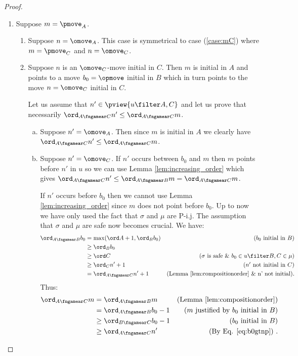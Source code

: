 \begin{proof}
\begin{enumerate}[(1)]
\item \label{case:mA} Suppose $m = \pmove_A$.
\begin{enumerate}

\item Suppose $n=\omove_A$.
This case is symmetrical to case
(\ref{case:mC}) where $m=\pmove_C$ and $n=\omove_C$.

\item Suppose  $n$ is an $\omove_C$-move initial in $C$.
Then $m$ is initial in $A$ and points to a move
$b_0 = \opmove$ initial in $B$ which in turn points to the
move $n =\omove_C$ initial in $C$.

Let us assume that $n'\in \pview{u\filter A,C}$ and let us prove that necessarily $\ord_{A\fngamear C} n' \leq \ord_{A\fngamear C} m$.

	\begin{enumerate}[(a)]
	\item Suppose $n'=\omove_A$. Then
since $m$ is initial in $A$ we clearly have 
$\ord_{A\fngamear C} n' \leq \ord_{A\fngamear C} m$.

	\item Suppose $n'=\omove_C$.
	If $n'$ occurs between $b_0$ and $m$ then $m$ points before $n'$ in 		$u$ so we can use Lemma \ref{lem:increasing_order} which gives $\ord_{A\fngamear C} n' \leq \ord_{A\fngamear B} m
		= \ord_{A\fngamear C} m$.
		\smallskip
		
		
		If $n'$ occurs before $b_0$ then 
		we cannot use Lemma \ref{lem:increasing_order}
		since $m$ does not point before $b_0$.
Up to now we have only used the fact that $\sigma$ and $\mu$ are P-i.j. The assumption that $\sigma$ and $\mu$ are safe now becomes crucial. We have:
		\begin{align}
		\ord_{A\fngamear B} b_0 
		& = \max(\ord A +1, \ord_B b_0) & \mbox{($b_0$ initial in $B$)} \nonumber \\
		& \geq \ord_B b_0 \nonumber  \\
		& \geq \ord C & \mbox{($\sigma$ is safe \& $b_0 \in u \filter  B,C \in \mu$)} \nonumber  \\
		& \geq \ord_C n' +1 & \mbox{($n'$ not initial in $C$)} \nonumber  \\
		& = \ord_{A\fngamear C} n' +1 & \mbox{(Lemma \ref{lem:compositionorder} \& \mbox{n' not initial})}. \label{eq:b0gtnp}
		\end{align}
Thus:
		\begin{align*}
		\ord_{A\fngamear C} m 
		& = \ord_{A\fngamear B} m & \mbox{(Lemma \ref{lem:compositionorder})} \\
		& = \ord_{A\fngamear B} b_0 -1  & \mbox{($m$ justified by $b_0$ initial in $B$)} \\
		& \geq \ord_{B\fngamear C} b_0 -1 & \mbox{($b_0$ initial in $B$)} \\
		& \geq \ord_{A\fngamear C} n' & \mbox{(By Eq. \ref{eq:b0gtnp})} \ .
		\end{align*}
		\end{enumerate}


\end{enumerate}
\end{enumerate}
\end{proof}
